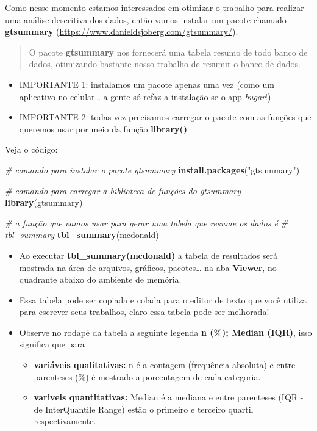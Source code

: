 \documentclass[
]{book}
\newenvironment{Shaded}{\begin{snugshade}}{\end{snugshade}}
\newcommand{\CommentTok}[1]{\textcolor[rgb]{0.56,0.35,0.01}{\textit{#1}}}
\newcommand{\FunctionTok}[1]{\textcolor[rgb]{0.13,0.29,0.53}{\textbf{#1}}}
\newcommand{\NormalTok}[1]{#1}
\newcommand{\StringTok}[1]{\textcolor[rgb]{0.31,0.60,0.02}{#1}}
\begin{document}
Como nesse momento estamos interessados em otimizar o trabalho para realizar uma análise descritiva dos dados, então vamos instalar um pacote chamado \textbf{gtsummary} (\url{https://www.danieldsjoberg.com/gtsummary/}).

\begin{quote}
O pacote \textbf{gtsummary} nos fornecerá uma tabela resumo de todo banco de dados, otimizando bastante nosso trabalho de resumir o banco de dados.
\end{quote}

\begin{itemize}
\item
  IMPORTANTE 1: instalamos um pacote apenas uma vez (como um aplicativo no celular\ldots{} a gente só refaz a instalação se o app \emph{bugar}!)
\item
  IMPORTANTE 2: todas vez precisamos carregar o pacote com as funções que queremos usar por meio da função \textbf{library()}
\end{itemize}

Veja o código:

\begin{Shaded}
\begin{Highlighting}[]
\CommentTok{\# comando para instalar o pacote gtsummary}
\FunctionTok{install.packages}\NormalTok{(}\StringTok{"gtsummary"}\NormalTok{)}

\CommentTok{\# comando para carregar a biblioteca de funções do gtsummary}
\FunctionTok{library}\NormalTok{(gtsummary)}

\CommentTok{\# a função que vamos usar para gerar uma tabela que resume os dados é}
\CommentTok{\# tbl\_summary}
\FunctionTok{tbl\_summary}\NormalTok{(mcdonald)}
\end{Highlighting}
\end{Shaded}

\begin{itemize}
\item
  Ao executar \textbf{tbl\_summary(mcdonald)} a tabela de resultados será mostrada na área de arquivos, gráficos, pacotes\ldots{} na aba \textbf{Viewer}, no quadrante abaixo do ambiente de memória.
\item
  Essa tabela pode ser copiada e colada para o editor de texto que você utiliza para escrever seus trabalhos, claro essa tabela pode ser melhorada!
\item
  Observe no rodapé da tabela a seguinte legenda \textbf{n (\%); Median (IQR)}, isso significa que para

  \begin{itemize}
  \item
    \textbf{variáveis qualitativas:} n é a contagem (frequência absoluta) e entre parenteses (\%) é mostrado a porcentagem de cada categoria.
  \item
    \textbf{variveis quantitativas:} Median é a mediana e entre parenteses (IQR - de InterQuantile Range) estão o primeiro e terceiro quartil respectivamente.
  \end{itemize}
\end{itemize}
\end{document}
